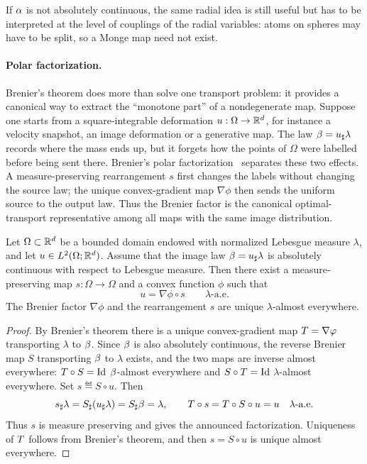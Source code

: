 If $\alpha$ is not absolutely continuous, the same radial idea is still useful but has to be interpreted at the level of couplings of the radial variables: atoms on spheres may have to be split, so a Monge map need not exist.

\paragraph{Polar factorization.}

Brenier's theorem does more than solve one transport problem: it provides a canonical way to extract the ``monotone part'' of a nondegenerate map. Suppose one starts from a square-integrable deformation $u:\Omega\to\mathbb{R}^d$, for instance a velocity snapshot, an image deformation or a generative map. The law $\beta=u_\sharp\lambda$ records where the mass ends up, but it forgets how the points of $\Omega$ were labelled before being sent there. Brenier's polar factorization~\cite{MR923203,Brenier91} separates these two effects. A measure-preserving rearrangement $s$ first changes the labels without changing the source law; the unique convex-gradient map $\nabla\phi$ then sends the uniform source to the output law. Thus the Brenier factor is the canonical optimal-transport representative among all maps with the same image distribution.

\begin{prop}\label{prop-polar-factorization}
	Let $\Omega\subset\mathbb{R}^d$ be a bounded domain endowed with normalized Lebesgue measure $\lambda$, and let $u\in L^2(\Omega;\mathbb{R}^d)$. Assume that the image law $\beta=u_\sharp\lambda$ is absolutely continuous with respect to Lebesgue measure. Then there exist a measure-preserving map $s:\Omega\to\Omega$ and a convex function $\phi$ such that
	\[
		u=\nabla\phi\circ s
		\qquad \lambda\text{-a.e.}
	\]
	The Brenier factor $\nabla\phi$ and the rearrangement $s$ are unique $\lambda$-almost everywhere.
\end{prop}
\begin{proof}
	By Brenier's theorem there is a unique convex-gradient map $T=\nabla\varphi$ transporting $\lambda$ to $\beta$. Since $\beta$ is also absolutely continuous, the reverse Brenier map $S$ transporting $\beta$ to $\lambda$ exists, and the two maps are inverse almost everywhere: $T\circ S=\mathrm{Id}$ $\beta$-almost everywhere and $S\circ T=\mathrm{Id}$ $\lambda$-almost everywhere. Set $s\eqdef S\circ u$. Then
	\[
		s_\sharp\lambda=S_\sharp(u_\sharp\lambda)=S_\sharp\beta=\lambda,
		\qquad
		T\circ s=T\circ S\circ u=u
		\quad\lambda\text{-a.e.}
	\]
	Thus $s$ is measure preserving and gives the announced factorization. Uniqueness of $T$ follows from Brenier's theorem, and then $s=S\circ u$ is unique almost everywhere.
\end{proof}

